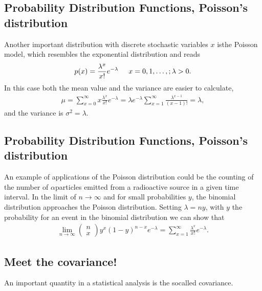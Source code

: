 \documentclass[letterpaper,10pt,english]{sphinxmanual}
\begin{document}
\subsection{Probability Distribution Functions, Poisson’s  distribution}
\label{\detokenize{chapter3:probability-distribution-functions-poisson-s-distribution}}
Another important distribution with discrete stochastic variables \(x\) isthe Poisson model, which resembles the exponential distribution and reads
\begin{equation*}
\begin{split}
p(x) = \frac{\lambda^x}{x!} e^{-\lambda} \hspace{0.5cm}x=0,1,\dots,;\lambda > 0.
\end{split}
\end{equation*}
In this case both the mean value and the variance are easier to calculate,
\begin{equation*}
\begin{split}
\mu = \sum_{x=0}^{\infty} x \frac{\lambda^x}{x!} e^{-\lambda} = \lambda e^{-\lambda}\sum_{x=1}^{\infty}
\frac{\lambda^{x-1}}{(x-1)!}=\lambda,
\end{split}
\end{equation*}
and the variance is \(\sigma^2=\lambda\).


\subsection{Probability Distribution Functions, Poisson’s  distribution}
\label{\detokenize{chapter3:id3}}
An example of applications of the Poisson distribution could be the counting
of the number of \(\alpha\)\sphinxhyphen{}particles emitted from a radioactive source in a given time interval.
In the limit of \(n\rightarrow \infty\) and for small probabilities \(y\), the binomial distribution
approaches the Poisson distribution. Setting \(\lambda = ny\), with \(y\) the probability for an event in
the binomial distribution we can show that
\begin{equation*}
\begin{split}
\lim_{n\rightarrow \infty}\left(\begin{array}{c} n \\ x\end{array}\right)y^x(1-y)^{n-x} e^{-\lambda}=\sum_{x=1}^{\infty}\frac{\lambda^x}{x!} e^{-\lambda}.
\end{split}
\end{equation*}

\subsection{Meet the  covariance!}
\label{\detokenize{chapter3:meet-the-covariance}}
An important quantity in a statistical analysis is the so\sphinxhyphen{}called covariance.
\end{document}
